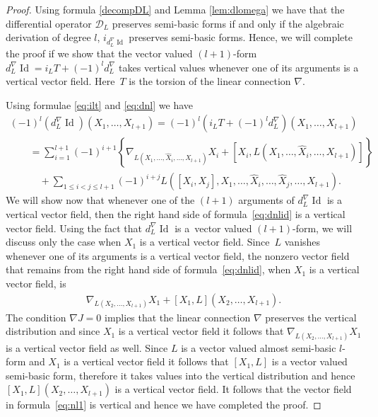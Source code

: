 \begin{proof}
Using formula \eqref{decompDL} and Lemma \ref{lem:dlomega} we have
that the dif\/ferential operator ${\mathcal D}_L$ preserves semi-basic forms
if and only if the algebraic derivation of degree $l$,
$i_{d^{\nabla}_L\operatorname{Id}}$ preserves semi-basic forms. Hence,
we will complete the proof if we show that the vector valued
$(l+1)$-form $d^{\nabla}_L\operatorname{Id}=i_LT+(-1)^ld^{\nabla}_L$
takes vertical values whenever one of its arguments is a vertical
vector f\/ield. Here~$T$ is the torsion of the linear connection $\nabla$.

Using formulae \eqref{eq:ilt} and \eqref{eq:dnl} we have
\begin{gather}
\nonumber   (-1)^l(d^{\nabla}_L\operatorname{Id})(X_1,\dots ,X_{l+1}) =(-1)^l(i_LT+(-1)^ld^{\nabla}_L)(X_1,\dots ,X_{l+1})
\\[-0.5ex] \nonumber
\qquad{}  =  \sum_{i=1}^{l+1}(-1)^{i+1}
\left\{\nabla_{L(X_1,\dots ,\hat{X}_i,\dots ,X_{l+1})}X_i + [X_i,
  L(X_1,\dots ,\hat{X}_i,\dots ,X_{l+1})]\right\} \\[-0.5ex]
 \qquad\quad{}  +  \sum_{1\leq i<j\leq
  l+1} (-1)^{i+j}L([X_i,X_j], X_1,\dots , \hat{X}_i,\dots , \hat{X}_j,\dots ,
X_{l+1}). \label{eq:dnlid}
\end{gather}
We will show now that whenever one of the
$(l+1)$ arguments of $d^{\nabla}_L\operatorname{Id}$ is a vertical
vector f\/ield, then the right hand side of formula~\eqref{eq:dnlid} is
a vertical vector f\/ield. Using the fact that $d^{\nabla}_L\operatorname{Id}$ is a~vector valued $(l+1)$-form, we will discuss only the case when $X_1$ is a vertical
vector f\/ield. Since~$L$ vanishes whenever one of its arguments is a
vertical vector f\/ield, the nonzero vector f\/ield that remains from the
right hand side of formula~\eqref{eq:dnlid}, when $X_1$ is a vertical
vector f\/ield, is
\begin{gather}
\nabla_{L(X_2,\dots ,X_{l+1})}X_1+[X_1,L](X_2,\dots ,X_{l+1}). \label{eq:nl1}
\end{gather} The condition $\nabla J=0$ implies that the linear
connection $\nabla$ preserves the vertical distribution and since $X_1$ is a vertical
vector f\/ield it follows that $\nabla_{L(X_2,\dots,X_{l+1})}X_1 $ is a
vertical vector f\/ield as well. Since $L$ is a vector valued almost
semi-basic $l$-form and $X_1$ is a vertical
vector f\/ield it follows that $[X_1, L]$ is a vector valued semi-basic
form, therefore it takes values into the vertical distribution and
hence  $[X_1,L](X_2,\dots ,X_{l+1})$ is a vertical vector f\/ield. It
follows that the vector f\/ield in formula~\eqref{eq:nl1} is vertical
and hence we have completed the proof.
\end{proof}


